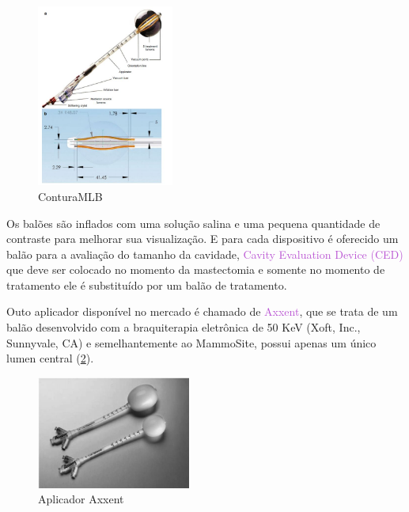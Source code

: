 \documentclass[11pt,a4paper]{article}
\begin{document}
\begin{itemize}
					\begin{figure}[h]
						\centering
						\includegraphics[width=0.4\textwidth]{Imagens/conturaMLB.JPG}
						\caption{ConturaMLB}
						\label{img:conturaMLB}
					\end{figure}
				\end{itemize}
			
			Os balões são inflados com uma solução salina e uma pequena quantidade de contraste para melhorar sua visualização. E para cada dispositivo é oferecido um balão para a avaliação do tamanho da cavidade, \textcolor{MediumOrchid}{Cavity Evaluation Device (CED)} que deve ser colocado no momento da mastectomia e somente no momento de tratamento ele é substituído por um balão de tratamento.

			Outo aplicador disponível no mercado é chamado de \textcolor{MediumOrchid}{Axxent}, que se trata de um balão desenvolvido com a braquiterapia eletrônica de 50 KeV (Xoft, Inc., Sunnyvale, CA) e semelhantemente ao MammoSite, possui apenas um único lumen central (\ref{img:axxent}).

			\begin{figure}[h]
				\centering
				\includegraphics[width=0.45\textwidth]{Imagens/axxent.JPG}
				\caption{Aplicador Axxent}
				\label{img:axxent}
			\end{figure}

		








	\pagebreak
	
\end{document}
